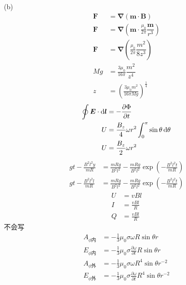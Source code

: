 (b)\begin{align*}
    \boldsymbol F&=\boldsymbol \nabla\left(\boldsymbol m\cdot\boldsymbol B\right)\\
    \boldsymbol F&=\boldsymbol \nabla\left(\boldsymbol m\cdot\frac{\mu_0}{2\pi}\dfrac{\boldsymbol{m}}{r^3}\right)\\
    \boldsymbol F&=\boldsymbol \nabla\left(\frac{\mu_0}{2\pi}\dfrac{{m^2}}{8z^3}\right)\\
    Mg&=\frac{3\mu_0}{16\pi}\dfrac{{m^2}}{z^4}\\
    z&=\left(\frac{3\mu_0m^2}{16\pi Mg}\right)^\frac14
\end{align*}
\begin{align*}
    \oint\boldsymbol{E}\cdot\dif\boldsymbol{l}&=-\frac{\partial \Phi}{\partial t}\\
    U&=\frac{B_z}{4}\omega r^2\int_{0}^{\pi}\sin\theta\dif \theta\\
    U&=\frac{B_z}{2}\omega r^2
\end{align*}
\begin{align*}
    gt-\frac{B^2l^2y}{mR}&=\frac{mRg}{B^2l^2}-\frac{mRg}{B^2l^2}\exp\left(-\frac{B^2l^2t}{mR}\right)\\
    gt-\frac{B^2l^2l}{mR}&=\frac{mRg}{B^2l^2}-\frac{mRg}{B^2l^2}\exp\left(-\frac{B^2l^2t}{mR}\right)
\end{align*}
\begin{align*}
        U&=vBl\\
    I&=\frac{vBl}{R}\\
Q&=\frac{vBl}{R}
\end{align*}
不会写
\begin{align*}
    A_{\phi\text{内}}
&=-\frac{1}{3}\mu_0\sigma\omega R\sin\theta r\\
E_{\phi\text{内}}&=-\frac{1}{3}\mu_0\sigma\frac{\partial \omega}{\partial t} R\sin\theta r\\
A_{\phi\text{外}}
&=-\frac{1}{3}\mu_0\sigma\omega R^4\sin\theta r^{-2}\\
E_{\phi\text{外}}
&=-\frac{1}{3}\mu_0\sigma\frac{\partial \omega}{\partial t} R^4\sin\theta r^{-2}
\end{align*}
